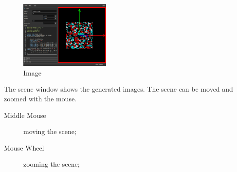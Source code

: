 \begin{figure}[h]
\centering
\includegraphics[width=0.4\textwidth]{imgs/main-scene-0.png}
\caption{Image}\label{fig:main-scene-0}
\end{figure}

The scene window shows the generated images. The scene can be moved and zoomed
with the mouse.

\begin{description}
\item[Middle Mouse] moving the scene;
\item[Mouse Wheel] zooming the scene;
\end{description}

